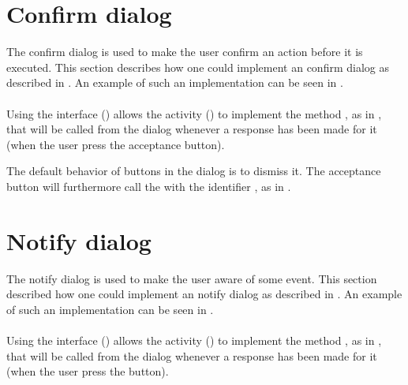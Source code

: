 \section{Confirm dialog}
\label{sec:impl_confirm_dialog}

The confirm dialog is used to make the user confirm an action before it is executed. This section describes how one could implement an confirm dialog as described in . An example of such an implementation can be seen in .
\\\\
Using the  interface () allows the activity () to implement the method , as in , that will be called from the dialog whenever a response has been made for it (when the user press the acceptance button).  



\noindent
The default behavior of buttons in the dialog is to dismiss it. The acceptance button will furthermore call the  with the identifier , as in .

\section{Notify dialog}
\label{sec:impl_notify_dialog}
The notify dialog is used to make the user aware of some event. This section described how one could implement an notify dialog as described in . An example of such an implementation can be seen in .
\\\\
Using the  interface () allows the activity () to implement the method , as in , that will be called from the dialog whenever a response has been made for it (when the user press the button).  

